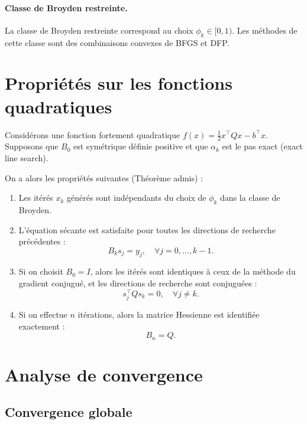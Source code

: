 \paragraph{Classe de Broyden restreinte.}
La classe de Broyden restreinte correspond au choix $\phi_k \in [0, 1)$.
Les méthodes de cette classe sont des combinaisons convexes de BFGS et DFP.

\section{Propriétés sur les fonctions quadratiques}

Considérons une fonction fortement quadratique $f(x) = \frac{1}{2} x^\top Q x - b^\top x$.
Supposons que $B_0$ est symétrique définie positive et que $\alpha_k$ est le pas exact (exact line search).

On a alors les propriétés suivantes (Théorème admis) :
\begin{enumerate}
    \item Les itérés $x_k$ générés sont indépendants du choix de $\phi_k$ dans la classe de Broyden.
    \item L'équation sécante est satisfaite pour toutes les directions de recherche précédentes :
    \begin{equation}
        B_k s_j = y_j, \quad \forall j = 0, \dots, k-1.
    \end{equation}
    \item Si on choisit $B_0 = I$, alors les itérés sont identiques à ceux de la méthode du gradient conjugué, et les directions de recherche sont conjuguées :
    \begin{equation}
        s_j^\top Q s_k = 0, \quad \forall j \neq k.
    \end{equation}
    \item Si on effectue $n$ itérations, alors la matrice Hessienne est identifiée exactement :
    \begin{equation}
        B_n = Q.
    \end{equation}
\end{enumerate}

\section{Analyse de convergence}

\subsection{Convergence globale}

